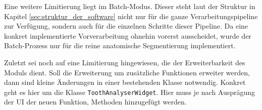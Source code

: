 Eine weitere Limitierung liegt im Batch-Modus. Dieser steht laut der Struktur in
Kapitel \ref{sec:struktur_der_software} nicht nur für die ganze
Verarbeitungspipeline zur Verfügung, sondern auch für die einzelnen Schritte dieser
Pipeline. Da eine konkret implementierte Vorverarbeitung ohnehin vorerst
ausscheidet, wurde der Batch-Prozess nur für die reine anatomische Segmentierung
implementiert.

Zuletzt sei noch auf eine Limitierung hingewiesen, die der Erweiterbarkeit des
Moduls dient. Soll die Erweiterung um zusätzliche Funktionen erweiter werden,
dann sind kleine Änderungen in einer bestehenden Klasse notwendig. Konkret geht es
hier um die Klasse \texttt{ToothAnalyserWidget}. Hier muss je nach Ausprägung der
\ac{UI} der neuen Funktion, Methoden hinzugefügt werden.
